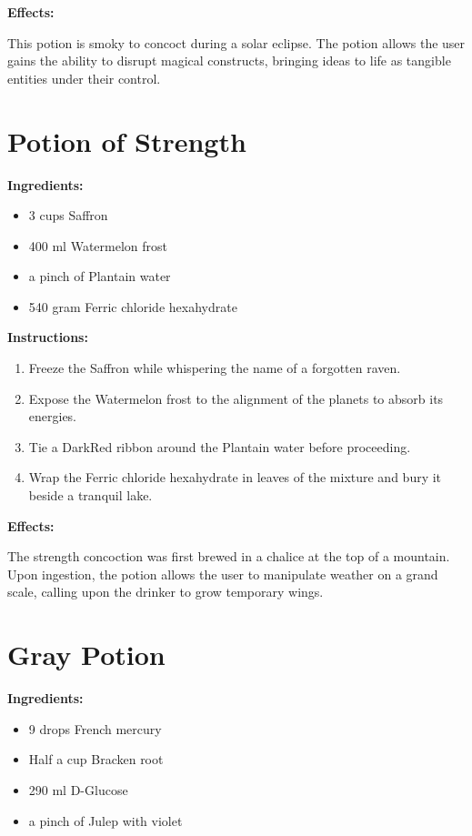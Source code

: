 \documentclass{article}
\begin{document}
\textbf{Effects:}

This potion is smoky to concoct during a solar eclipse. The potion allows the user gains the ability to disrupt magical constructs, bringing ideas to life as tangible entities under their control.

\newpage
\section*{Potion of Strength}

\textbf{Ingredients:}

\begin{itemize}
  \item 3 cups Saffron
  \item 400 ml Watermelon frost
  \item a pinch of Plantain water
  \item 540 gram Ferric chloride hexahydrate
\end{itemize}

\textbf{Instructions:}

\begin{enumerate}
  \item Freeze the Saffron while whispering the name of a forgotten raven.
  \item Expose the Watermelon frost to the alignment of the planets to absorb its energies.
  \item Tie a DarkRed ribbon around the Plantain water before proceeding.
  \item Wrap the Ferric chloride hexahydrate in leaves of the mixture and bury it beside a tranquil lake.
\end{enumerate}

\textbf{Effects:}

The strength concoction was first brewed in a chalice at the top of a mountain. Upon ingestion, the potion allows the user to manipulate weather on a grand scale, calling upon the drinker to grow temporary wings.

\newpage
\section*{Gray Potion}

\textbf{Ingredients:}

\begin{itemize}
  \item 9 drops French mercury
  \item Half a cup Bracken root
  \item 290 ml D-Glucose
  \item a pinch of Julep with violet
\end{itemize}
\end{document}
